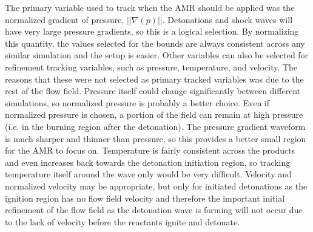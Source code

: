 The primary variable used to track when the AMR should be applied was the normalized gradient of pressure, \( ||\nabla(p)||\). Detonations  and shock waves will have very large pressure gradients, so this is a logical selection. By normalizing this quantity, the values selected for the bounds are always consistent across any similar simulation and the setup is easier. Other variables can also be selected for refinement tracking variables, such as pressure, temperature, and velocity. The reasons that these were not selected as primary tracked variables was due to the rest of the flow field. Pressure itself could change significantly between different simulations, so normalized pressure is probably a better choice. Even if normalized pressure is chosen, a portion of the field can remain at high pressure (i.e. in the burning region after the detonation). The pressure gradient waveform is much sharper and thinner than pressure, so this provides a better small region for the AMR to focus on. Temperature is fairly consistent across the products and even increases back towards the detonation initiation region, so tracking temperature itself around the wave only would be very difficult. Velocity and normalized velocity may be appropriate, but only for initiated detonations as the ignition region has no flow field velocity and therefore the important initial refinement of the flow field as the detonation wave is forming will not occur due to the lack of velocity before the reactants ignite and detonate. 


